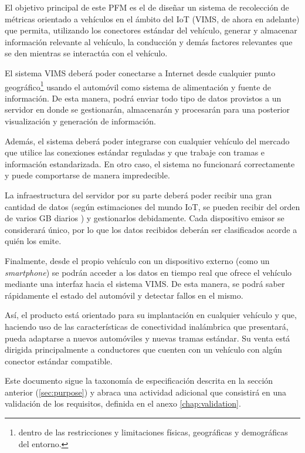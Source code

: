 El objetivo principal de este \ac{PFM} es el de diseñar un sistema de recolección
de métricas orientado a vehículos en el ámbito del \ac{IoT} (\ac{VIMS}, de ahora en adelante)
que permita, utilizando los conectores estándar del vehículo, generar y almacenar
información relevante al vehículo, la conducción y demás factores relevantes que
se den mientras se interactúa con el vehículo.

El sistema \ac{VIMS} deberá poder conectarse a Internet desde cualquier punto
geográfico\footnote{dentro de las restricciones y limitaciones físicas, geográficas y
demográficas del entorno.} usando el automóvil como sistema de alimentación y
fuente de información. De esta manera, podrá enviar todo tipo de datos provistos 
a un servidor en donde se gestionarán, almacenarán y procesarán para 
una posterior visualización y generación de información.

Además, el sistema deberá poder integrarse con cualquier vehículo del mercado que
utilice las conexiones estándar reguladas y que trabaje con tramas e información
estandarizada. En otro caso, el sistema no funcionará correctamente y puede
comportarse de manera impredecible.

La infraestructura del servidor por su parte deberá poder recibir una gran cantidad
de datos (según estimaciones del mundo \ac{IoT}, se pueden recibir del orden de
varios \ac{GB} diarios \cite{vishHowMuchData2020}) y gestionarlos debidamente.
Cada dispositivo emisor se considerará único, por lo que los datos recibidos
deberán ser clasificados acorde a quién los emite.

Finalmente, desde el propio vehículo con un dispositivo externo (como un
\textit{smartphone}) se podrán acceder a los datos en tiempo real que ofrece el
vehículo mediante una interfaz hacia el sistema \ac{VIMS}. De esta manera, se
podrá saber rápidamente el estado del automóvil y detectar fallos en el mismo.

Así, el producto está orientado para su implantación en cualquier vehículo y que,
haciendo uso de las características de conectividad inalámbrica que presentará, pueda
adaptarse a nuevos automóviles y nuevas tramas estándar. Su venta está dirigida
principalmente a conductores que cuenten con un vehículo con algún conector estándar
compatible.

Este documento sigue la taxonomía de especificación descrita en la sección anterior (\ref{sec:purpose})
y abraca una actividad adicional que consistirá en una validación de los requisitos,
definida en el anexo \ref{chap:validation}.